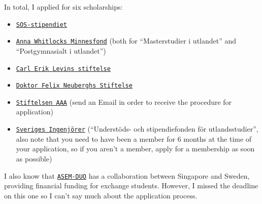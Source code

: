 In total, I applied for six scholarships:
\begin{itemize}
    \item \href{https://www.globalgrant.com/sos-stipendier}{\texttt{SOS-stipendiet}}
    \item \href{https://www.whitlocks.se/anna-whitlock/}{\texttt{Anna Whitlocks Minnesfond}} (both for ``Masterstudier i utlandet'' and ``Postgymnasialt i utlandet'')
    \item \href{https://www.stiftelseansokan.se/Pages/Levin.aspx}{\texttt{Carl Erik Levins stiftelse}}
    \item \href{https://www.felixneubergh.se}{\texttt{Doktor Felix Neuberghs Stiftelse}}
    \item \href{http://stipendieguiden.com/listing/stiftelsen-aaa/}{\texttt{Stiftelsen AAA}} (send an Email in order to receive the procedure for application)
    \item \href{https://www.sverigesingenjorer.se/medlemskap/stipendier/}{\texttt{Sveriges Ingenjörer}} (``Understöds- och stipendiefonden för utlandsstudier'', also note that you need to have been a member for 6 months at the time of your application, so if you aren't a member, apply for a membership as soon as possible)
\end{itemize}
I also know that \href{https://www.asemduo.org/02_programs/programs_02.php}{\texttt{ASEM-DUO}} has a collaboration between Singapore and Sweden, providing financial funding for exchange students. However, I missed the deadline on this one so I can't say much about the application process. 
